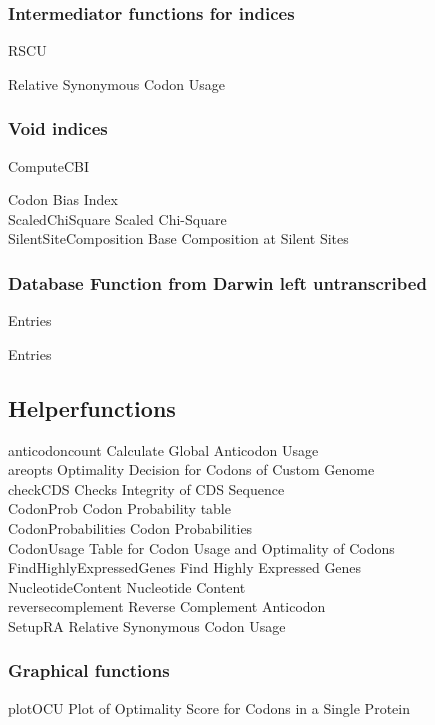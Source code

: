\subsubsection{Intermediator functions for indices}
\hypertarget{function:RSCU}{RSCU}	Relative \quad Synonymous Codon Usage \\								%

\subsubsection{Void indices}
\hypertarget{function:CBI}{ComputeCBI}	\quad Codon Bias Index  \\
\hypertarget{function:Chi2}{ScaledChiSquare}	\quad Scaled Chi-Square  \\
\hypertarget{function:SSC}{SilentSiteComposition}	\quad Base Composition at Silent Sites  \\

\subsubsection{Database Function from Darwin left untranscribed}
\hypertarget{function:Entries}{Entries}	\quad Entries \\

\subsection{Helperfunctions}
anticodoncount	\quad Calculate Global Anticodon Usage \\
areopts	\quad Optimality Decision for Codons of Custom Genome \\
checkCDS	Checks \quad Integrity of CDS Sequence \\
CodonProb	\quad Codon Probability table \\
CodonProbabilities	\quad Codon Probabilities \\
CodonUsage	\quad Table for Codon Usage and Optimality of Codons \\
FindHighlyExpressedGenes	\quad Find Highly Expressed Genes \\			%
NucleotideContent	\quad Nucleotide Content \\							%
reversecomplement	\quad Reverse Complement Anticodon \\
SetupRA	\quad Relative Synonymous Codon Usage \\

\subsubsection{Graphical functions}
plotOCU	\quad Plot of Optimality Score for Codons in a Single Protein \\

